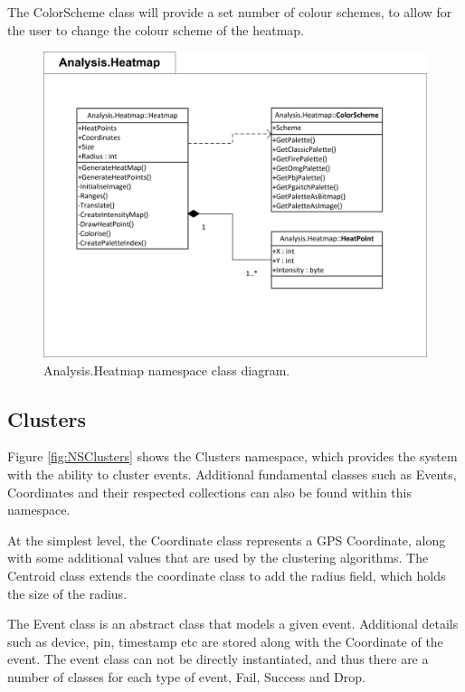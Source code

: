 The ColorScheme class will provide a set number of colour schemes, to allow for 
the user to change the colour scheme of the heatmap.

\begin{figure}[H]
  \centering
    \includegraphics[scale=0.9]{chapter7/class_diagrams/analysis_heatmap_namespace.png}
    \caption[Analysis.Heapmap namespace class diagram]
            {Analysis.Heatmap namespace class diagram.}
    \label{fig:NSHeatmap}
\end{figure}



\subsection{Clusters}
Figure \ref{fig:NSClusters} shows the Clusters namespace, which provides the 
system with the ability to cluster events. Additional fundamental classes such 
as Events, Coordinates and their respected collections can also be found within
this namespace.

At the simplest level, the Coordinate class represents a GPS Coordinate, along 
with some additional values that are used by the clustering algorithms. The 
Centroid class extends the coordinate class to add the radius field, which holds
the size of the radius. 

The Event class is an abstract class that models a given event. Additional 
details such as device, pin, timestamp etc are stored along with the Coordinate 
of the event. The event class can not be directly instantiated, and thus there 
are a number of classes for each type of event, Fail, Success and Drop.

